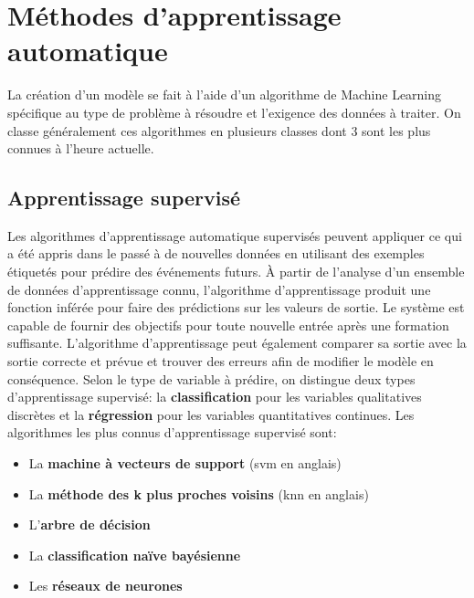 \section{Méthodes d'apprentissage automatique}
La création d’un modèle se fait à l’aide d’un algorithme de Machine Learning spécifique au type de problème à résoudre et l'exigence des données à traiter.  On classe généralement ces algorithmes en plusieurs classes dont 3 sont les plus connues à l’heure actuelle.

    \subsection{Apprentissage supervisé}
    Les algorithmes d'apprentissage automatique supervisés peuvent appliquer ce qui a été appris dans le passé à de nouvelles données en utilisant des exemples étiquetés pour prédire des événements futurs. À partir de l'analyse d'un ensemble de données d'apprentissage connu, l'algorithme d'apprentissage produit une fonction inférée pour faire des prédictions sur les valeurs de sortie. Le système est capable de fournir des objectifs pour toute nouvelle entrée après une formation suffisante. L'algorithme d'apprentissage peut également comparer sa sortie avec la sortie correcte et prévue et trouver des erreurs afin de modifier le modèle en conséquence.\cite{expertAi}
    Selon le type de variable à prédire, on distingue deux types d’apprentissage supervisé: la \textbf{classification} pour les variables qualitatives discrètes et la \textbf{régression} pour les variables quantitatives continues.
    Les algorithmes les plus connus d’apprentissage supervisé sont:
    \begin{itemize}
        \item La \textbf{machine à vecteurs de support} (\acrshort{svm} en anglais)
        \item La \textbf{méthode des k plus proches voisins} (\acrshort{knn} en anglais)
        \item L'\textbf{arbre de décision}
        \item La \textbf{classification naïve bayésienne}
        \item Les \textbf{réseaux de neurones}
    \end{itemize}

